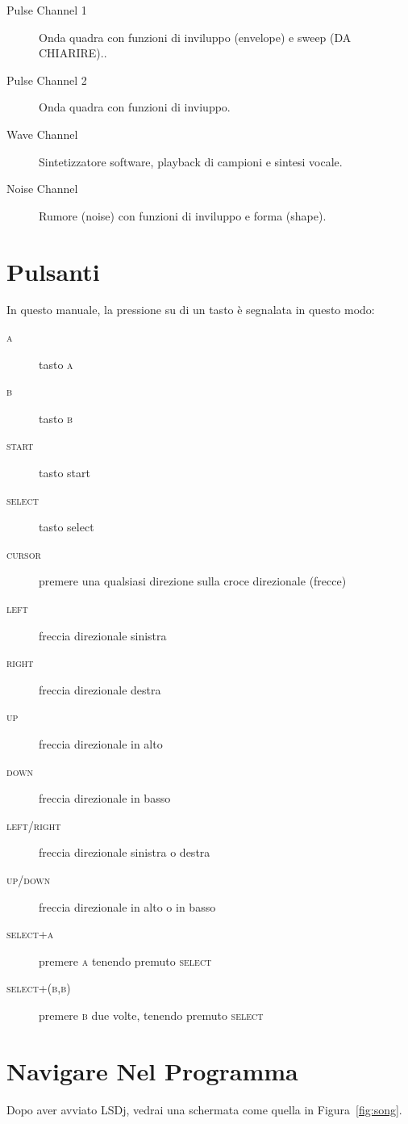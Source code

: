 \begin{description}
\item[Pulse Channel 1] Onda quadra con funzioni di inviluppo (envelope) e sweep (DA CHIARIRE)..
\item[Pulse Channel 2] Onda quadra con funzioni di inviuppo.
\item[Wave Channel] Sintetizzatore software, playback di campioni e sintesi vocale.
\item[Noise Channel] Rumore (noise) con funzioni di inviluppo e forma (shape).
\end{description}


\section{Pulsanti}
In questo manuale, la pressione su di un tasto è segnalata in questo modo:
\begin{description}
\item[\textsc{a}] tasto \textsc{a} 
\item[\textsc{b}] tasto \textsc{b} 
\item[\textsc{start}] tasto start
\item[\textsc{select}] tasto select
\item[\textsc{cursor}] premere una qualsiasi direzione sulla croce direzionale (frecce) 
\item[\textsc{left}] freccia direzionale sinistra
\item[\textsc{right}] freccia direzionale destra
\item[\textsc{up}] freccia direzionale in alto
\item[\textsc{down}] freccia direzionale in basso
\item[\textsc{left/right}] freccia direzionale sinistra o destra
\item[\textsc{up/down}] freccia direzionale in alto o in basso
\item[\textsc{select+a}] premere \textsc{a} tenendo premuto \textsc{select}
\item[\textsc{select+(b,b)}] premere \textsc{b} due volte, tenendo premuto \textsc{select}
\end{description}

\section{Navigare Nel Programma}
Dopo aver avviato LSDj, vedrai una schermata come quella in Figura~\ref{fig:song}.

